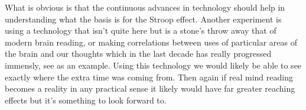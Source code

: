 \documentclass{article}
\begin{document}
What is obvious is that the continuous advances in technology should help in
understanding what the basis is for the Stroop effect.  Another experiment is
using a technology that isn't quite here but is a stone's throw away that of
modern brain reading, or making correlations between uses of particular areas of
the brain and our thoughts which in the last decade has really progressed
immensly, see \cite{Brain-to-text} as an example.  Using this technology we
would likely be able to see exactly where the extra time was coming from.  Then
again if real mind reading becomes a reality in any practical sense it likely
would have far greater reaching effects but it's something to look forward to.

\printbibliography[keyword=statistics , title={Statistics references}]
\printbibliography[keyword=Matplotlib , title={Matplotlib references}]
\printbibliography[keyword=SciPy , title={SciPy references}]
\printbibliography[keyword=PANDAS , title={PANDAS references}]
\printbibliography[keyword=Udacity , title={Udacity references}]
\printbibliography[keyword=LaTeX , title={{pdf\LaTeX}  references}]
\printbibliography[keyword=other , title={other references}]
\end{document}

